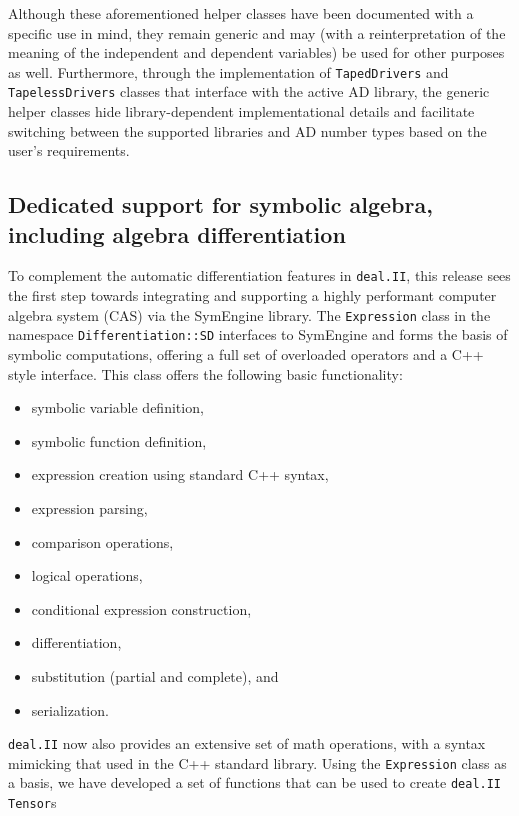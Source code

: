 \documentclass{ansarticle-preprint}
\newcommand{\specialword}[1]{\texttt{#1}}
\newcommand{\dealii}{{\specialword{deal.II}}\xspace}
\begin{document}
Although these aforementioned helper classes have been documented with a specific
use in mind, they remain generic and may (with a reinterpretation of the meaning of
the independent and dependent variables) be used for other purposes as well.
Furthermore, through the implementation of \texttt{TapedDrivers} and 
\texttt{TapelessDrivers} classes that interface with the active AD library, the 
generic helper classes hide library-dependent implementational details and facilitate 
switching between the supported libraries and AD number types based on the 
user's requirements.

\subsection{Dedicated support for symbolic algebra, including algebra differentiation}
\label{subsec:sd}
To complement the automatic differentiation features in \dealii{}, this release sees
the first step towards integrating and supporting a highly performant computer algebra 
system (CAS) via the SymEngine library.
The \texttt{Expression} class in the namespace \texttt{Differentiation::SD} interfaces
to SymEngine and forms the basis of symbolic computations, offering a full set of 
overloaded operators and a C++ style interface. This class offers the following 
basic functionality:
\begin{itemize}
\item symbolic variable definition,
\item symbolic function definition,
\item expression creation using standard C++ syntax,
\item expression parsing,
\item comparison operations,
\item logical operations,
\item conditional expression construction,
\item differentiation,
\item substitution (partial and complete), and
\item serialization.
\end{itemize}
\dealii{} now also provides an extensive set of math operations, with a syntax mimicking that used 
in the C++ standard library. Using the \texttt{Expression} class as a basis, we 
have developed a set of functions that can be used to create \dealii{} \texttt{Tensor}s
\end{document}
